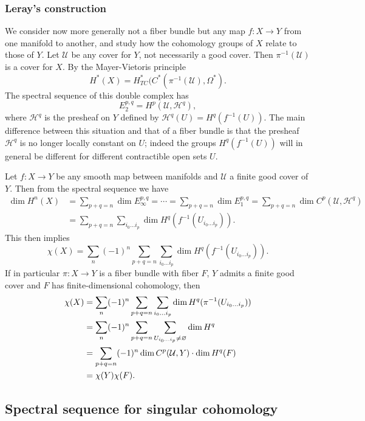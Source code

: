 \subsubsection{Leray's construction}
We consider now more generally not a fiber bundle but any map $f:X\to Y$ from one manifold to another, and study how the cohomology groups of $X$ relate to those of $Y$. 
Let $\mathcal{U}$ be any cover for $Y$, not necessarily a good cover. Then $\pi^{-1}(\mathcal{U})$ is a cover for $X$. By the Mayer-Vietoris principle
\[H^*(X)=H^*_{TC}(C^*(\pi^{-1}(\mathcal{U}),\Omega^*).\]
The spectral sequence of this double complex has
\[E_2^{p,q}=H^p(\mathcal{U},\mathscr{H}^q),\]
where $\mathscr{H}^q$ is the presheaf on $Y$ defined by $\mathscr{H}^q(U)=H^q(f^{-1}(U))$.
The main difference between this situation and that of a fiber bundle is that the presheaf $\mathscr{H}^q$ is no longer locally constant on $U$; indeed the groups 
$H^q(f^{-1}(U))$ will in general be different for different contractible open sets $U$.
\begin{example}
Let $f:X\to Y$ be any smooth map between manifolds and $\mathcal{U}$ a finite good cover of $Y$. Then from the spectral sequence we have
\begin{align*}
\dim H^n(X)&=\sum_{p+q=n}\dim E_{\infty}^{p,q}=\cdots=\sum_{p+q=n}\dim E_{1}^{p,q}=\sum_{p+q=n}\dim C^p(\mathcal{U},\mathscr{H}^q)\\
&=\sum_{p+q=n}\sum_{i_0\dots i_p}\dim H^q(f^{-1}(U_{i_0\dots i_p})).
\end{align*}
This then implies
\[\chi(X)=\sum_n(-1)^n\sum_{p+q=n}\sum_{i_0\dots i_p}\dim H^q(f^{-1}(U_{i_0\dots i_p})).\]
If in particular $\pi:X\to Y$ is a fiber bundle with fiber $F$, $Y$ admits a finite good cover and $F$ has finite-dimensional cohomology, then
\begin{align*}
\chi(X)&=\sum_n(-1)^n\sum_{p+q=n}\sum_{i_0\dots i_p}\dim H^q(\pi^{-1}(U_{i_0\dots i_p}))\\
&=\sum_n(-1)^n\sum_{p+q=n}\sum_{U_{i_0\dots i_p}\neq\varnothing}\dim H^q\\
&=\sum_{p+q=n}(-1)^n\dim C^p(\mathcal{U},Y)\cdot \dim H^q(F)\\
&=\chi(Y)\chi(F).
\end{align*}
\end{example}
\subsection{Spectral sequence for singular cohomology}
